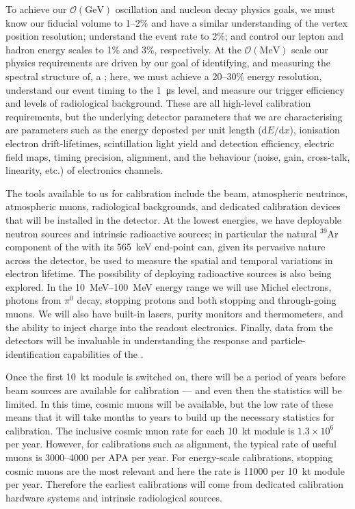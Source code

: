 To achieve our $\mathcal{O}(\si{\giga\electronvolt})$ oscillation and nucleon decay physics goals, we must know our fiducial volume to 1--2\% and have a similar understanding of the vertex position resolution; understand the \nue event rate to 2\%; and control our lepton and hadron energy scales to 1\% and 3\%, respectively. At the $\mathcal{O}(\si{\mega\electronvolt})$ scale our physics requirements are driven by our goal of identifying, and measuring the spectral structure of, a ; here, we must achieve a 20--30\% energy resolution, understand our event timing to the \SI{1}{\micro\second} level, and measure our trigger efficiency and levels of radiological background. These are all high-level calibration requirements, but the underlying detector parameters that we are characterising are parameters such as the energy deposted per unit length ($\mathrm{d}E/\mathrm{d}x$), ionisation electron drift-lifetimes, scintillation light yield and detection efficiency, electric field maps, timing precision,  alignment, and the behaviour (noise, gain, cross-talk, linearity, etc.) of electronics channels.

The tools available to us for calibration include the  beam, atmospheric neutrinos, atmospheric muons, radiological backgrounds, and dedicated calibration devices that will be installed in the detector. At the lowest energies, we have deployable neutron sources and intrinsic radioactive sources; in particular the natural $^{39}$Ar component of the  with its \SI{565}{\kilo\electronvolt} end-point can, given its pervasive nature across the detector, be used to measure the spatial and temporal variations in electron lifetime. The possibility of deploying radioactive sources is also being explored. In the \SIrange{10}{100}{\mega\electronvolt} energy range we will use Michel electrons, photons from $\pi^{0}$ decay, stopping protons and both stopping and through-going muons. We will also have built-in lasers, purity monitors and thermometers, and the ability to inject charge into the readout electronics. Finally, data from the  detectors will be invaluable in understanding the response and particle-identification capabilities of the .

Once the first \SI{10}{\kilo\tonne} module is switched on, there will be a period of years before  beam sources are available for calibration --- and even then the statistics will be limited. In this time, cosmic muons will be available, but the low rate of these means that it will take months to years to build up the necessary statistics for calibration. The inclusive cosmic muon rate for each \SI{10}{\kilo\tonne} module is $1.3\times 10^{6}$ per year. However, for calibrations such as  alignment, the typical rate of useful muons is 3000--4000 per APA per year. For energy-scale calibrations, stopping cosmic muons are the most relevant and here the rate is 11000 per \SI{10}{\kilo\tonne} module per year. Therefore the earliest calibrations will come from dedicated calibration hardware systems and intrinsic radiological sources.


